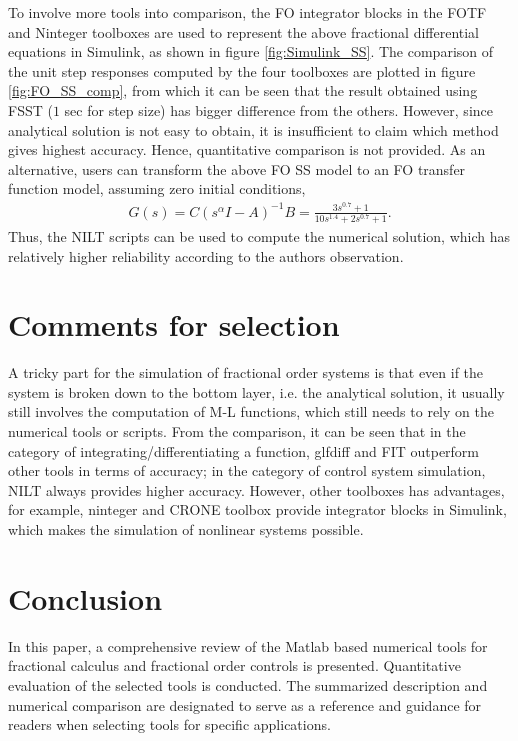 \documentclass[11pt]{tCON2e}
\theoremstyle{plain}\newtheorem{theorem}{Theorem}
\theoremstyle{definition}
\theoremstyle{remark}
\begin{document}
To involve more tools into comparison, the FO integrator blocks in the FOTF and Ninteger toolboxes are used to represent the above fractional differential equations in Simulink, as shown in figure \ref{fig:Simulink_SS}. The comparison of the unit step responses computed by the four toolboxes are plotted in figure \ref{fig:FO_SS_comp}, from which it can be seen that the result obtained using FSST ($1$ sec for step size) has bigger difference from the others. However, since analytical solution is not easy to obtain, it is insufficient to claim which method gives highest accuracy. Hence, quantitative comparison is not provided. As an alternative, users can transform the above FO SS model to an FO transfer function model, assuming zero initial conditions,
\begin{eqnarray}
G(s) = C(s^{\alpha}I-A)^{-1}B = \frac{3s^{0.7}+1}{10s^{1.4}+2s^{0.7}+1}.
\end{eqnarray}
Thus, the NILT scripts can be used to compute the numerical solution, which has relatively higher reliability according to the authors observation.




\section{Comments for selection}
\label{sec:com_for_sel}
A tricky part for the simulation of fractional order systems is that even if the system is broken down to the bottom layer, i.e. the analytical solution, it usually still involves the computation of M-L functions, which still needs to rely on the numerical tools or scripts.
From the comparison, it can be seen that in the category of integrating/differentiating a function, glfdiff and FIT outperform other tools in terms of accuracy; in the category of control system simulation, NILT always provides higher accuracy. However, other toolboxes has advantages, for example, ninteger and CRONE toolbox provide integrator blocks in Simulink, which makes the simulation of nonlinear systems possible.




\section{Conclusion}
In this paper, a comprehensive review of the Matlab based numerical tools for fractional calculus and fractional order controls is presented. Quantitative evaluation of the selected tools is conducted. The summarized description and numerical comparison are designated to serve as a reference and guidance for readers when selecting tools for specific applications.
\end{document}
